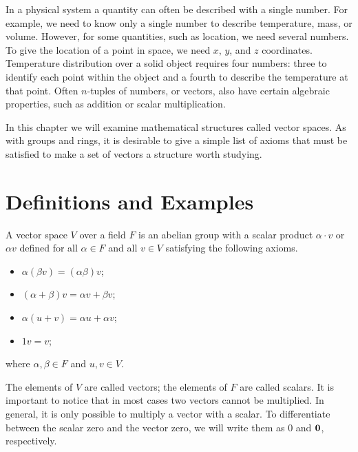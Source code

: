 

 
In a physical system a quantity can often be described with a single
number. For example, we need to know only a single number to describe
temperature, mass, or volume.  However, for some quantities, such as
location, we need several numbers. To give the location of a point in
space, we need $x$, $y$, and $z$ coordinates. Temperature
distribution over a solid object requires four numbers: three to
identify each point within the object and a fourth to describe the
temperature at that point.  Often $n$-tuples of numbers, or vectors,
also have certain algebraic properties, such as addition or scalar 
multiplication.  


In this chapter we will examine mathematical structures called vector
spaces. As with groups and rings, it is desirable to give a simple
list of axioms that must be satisfied to make a set of vectors a
structure worth studying.  
 
 
 
\section{Definitions and Examples}
 

A {\bfi vector space\/} $V$ over a
field $F$ is an abelian group with a {\bfi scalar
product\/} $\alpha \cdot v$ or $\alpha v$ defined
for all $\alpha \in F$ and all $v \in V$ satisfying the following
axioms.  
\begin{itemize}

\item 
$\alpha(\beta v) =(\alpha \beta)v$;

\item 
$(\alpha + \beta)v =\alpha v + \beta v$;

\item 
$\alpha(u + v) = \alpha u + \alpha v$;

\item 
$1v=v$;

\end{itemize}
where $\alpha, \beta \in F$ and $u, v \in V$.
 

The elements of $V$ are called {\bfi vectors}; the elements of $F$
are called {\bfi scalars}.  It is important to notice that in most
cases two vectors cannot be multiplied.  In general, it is only
possible to multiply a vector with a scalar. To differentiate between
the scalar zero and the vector zero, we will write them as 0 and
${\bold 0}$, respectively.  


